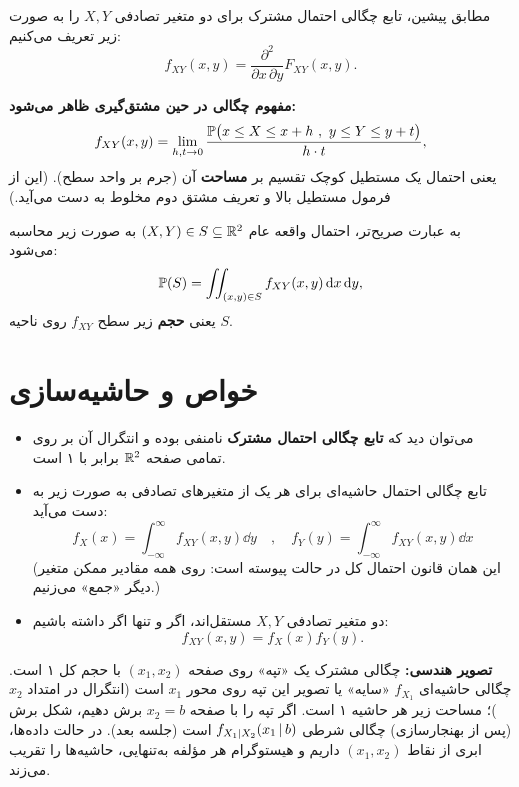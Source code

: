 \begin{definition}
مطابق پیشین، تابع چگالی احتمال مشترک برای دو متغیر تصادفی $X,Y$ را به صورت زیر تعریف می‌کنیم:
\[
f_{XY}(x,y)=\frac{\partial^2}{\partial x\,\partial y}F_{XY}(x,y).
\]
\end{definition}

\textbf{مفهوم چگالی در حین مشتق‌گیری ظاهر می‌شود:}
\[
f_{XY}(x,y)=\lim_{h,t\to0}\frac{\mathbb{P}\big(x\le X\le x+h\ ,\ y\le Y\le y+t\big)}{h\cdot t},
\]
یعنی احتمال یک مستطیل کوچک تقسیم بر \textbf{مساحت} آن (جرم بر واحد سطح). (این از فرمول مستطیل بالا و تعریف مشتق دوم مخلوط به دست می‌آید.)

به عبارت صریح‌تر، احتمال واقعه عام $(X,Y)\in S\subseteq\mathbb{R}^2$ به صورت زیر محاسبه می‌شود:
\[
\mathbb{P}(S)=\iint_{(x,y)\in S}f_{XY}(x,y)\,\mathrm{d} x\,\mathrm{d} y ,
\]
یعنی \textbf{حجم} زیر سطح $f_{XY}$ روی ناحیه $S$.

\section{خواص و حاشیه‌سازی }

\begin{itemize}
\item می‌توان دید که \textbf{تابع چگالی احتمال مشترک} نامنفی بوده و انتگرال آن بر روی تمامی صفحه $\mathbb{R}^2$ برابر با ۱ است.
\item تابع چگالی احتمال حاشیه‌ای برای هر یک از متغیرهای تصادفی به صورت زیر به دست می‌آید:
\[
\boxed{\ f_X(x)=\int_{-\infty}^{\infty}f_{XY}(x,y)\dd y\quad,\quad f_Y(y)=\int_{-\infty}^{\infty}f_{XY}(x,y)\dd x\ }
\]
(این همان قانون احتمال کل در حالت پیوسته است: روی همه مقادیر ممکن متغیر دیگر «جمع» می‌زنیم.)
\item دو متغیر تصادفی $X,Y$ مستقل‌اند، اگر و تنها اگر داشته باشیم:
\[
f_{XY}(x,y)=f_X(x)f_Y(y).
\]
\end{itemize}

\begin{note}
\notetitle \textbf{تصویر هندسی:} چگالی مشترک یک «تپه» روی صفحه $(x_1,x_2)$ با حجم کل ۱ است. چگالی حاشیه‌ای $f_{X_1}$ «سایه» یا تصویر این تپه روی محور $x_1$ است (انتگرال در امتداد $x_2$)؛ مساحت زیر هر حاشیه ۱ است. اگر تپه را با صفحه $x_2=b$ برش دهیم، شکل برش (پس از بهنجارسازی) چگالی شرطی $f_{X_1|X_2}(x_1\,|\, b)$ است (جلسه بعد). در حالت داده‌ها، ابری از نقاط $(x_1,x_2)$ داریم و هیستوگرام هر مؤلفه به‌تنهایی، حاشیه‌ها را تقریب می‌زند.
\end{note}

